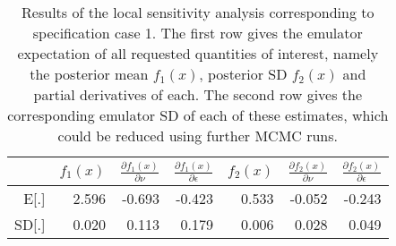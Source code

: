 \begin{table}[ht]
\centering
\begin{tabular}{|r|rrr|rrr|}
  \hline
 &  $f_1(x)$ & $\frac{\partial f_1(x)}{\partial \nu}$ & $\frac{\partial f_1(x)}{\partial \epsilon}$ & $f_2(x)$ & $\frac{\partial f_2(x)}{\partial \nu}$ & $\frac{\partial f_2(x)}{\partial \epsilon}$ \\ 
  \hline
E[.] & 2.596 & -0.693 & -0.423 & 0.533 & -0.052 & -0.243 \\ 
  SD[.] & 0.020 & 0.113 & 0.179 & 0.006 & 0.028 & 0.049 \\ 
   \hline
\end{tabular}
\caption{\footnotesize{Results of the local sensitivity analysis corresponding to specification case 1. The first row gives the emulator expectation of all requested quantities of interest, namely the posterior mean $f_1(x)$, posterior SD $f_2(x)$ and partial derivatives of each. The second row gives the corresponding emulator SD of each of these estimates, which could be reduced using further MCMC runs.}} 
\label{tab_case1}
\end{table}
